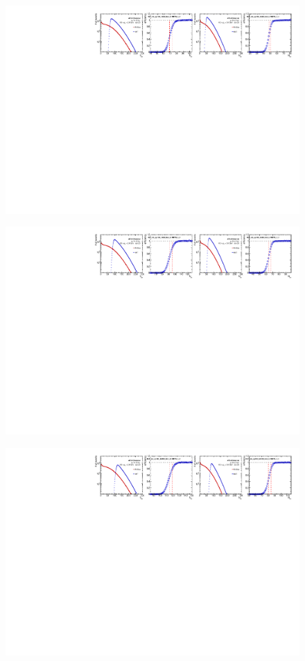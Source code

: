 \begin{figure}[H]
\centering
\includegraphics[width=1.\linewidth]{figs/sec_evtSlc/trigEff_pPb5_run2/trigEff_Trig6.pdf}
\end{figure}
\begin{figure}[H]
\centering
\includegraphics[width=1.\linewidth]{figs/sec_evtSlc/trigEff_pPb5_run2/trigEff_Trig8.pdf}
\end{figure}
\begin{figure}[H]
\centering
\includegraphics[width=1.\linewidth]{figs/sec_evtSlc/trigEff_pPb5_run2/trigEff_Trig10.pdf}
\end{figure}
